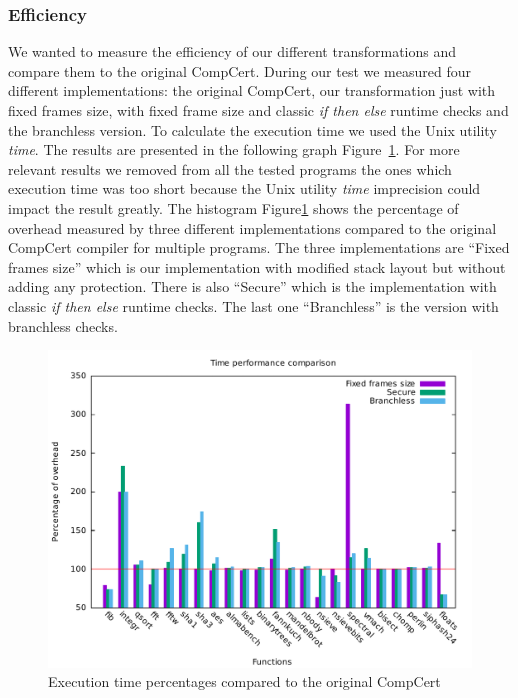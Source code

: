 \documentclass[11pt]{sdm}
\begin{document}
\subsubsection{Efficiency}
\label{ssub:Efficiency}

We wanted to measure the efficiency of our different transformations and compare them to the original CompCert. During our test we measured four different implementations: the original CompCert, our transformation just with fixed frames size, with fixed frame size and classic \textit{if then else} runtime checks and the branchless version.
To calculate the execution time we used the Unix utility \textit{time}.
The results are presented in the following graph Figure~\ref{time_percentage_graph}.
For more relevant results we removed from all the tested programs the ones which execution time was too short because the Unix utility \textit{time} imprecision could impact the result greatly.
The histogram Figure\ref{time_percentage_graph} shows the percentage of overhead measured by three different implementations compared to the original CompCert compiler for multiple programs.
The three implementations are ``Fixed frames size'' which is our implementation with modified stack layout but without adding any protection. There is also ``Secure'' which is the implementation with classic \textit{if then else} runtime checks. The last one ``Branchless'' is the version with branchless checks.

\begin{figure}[!ht]
\centering
\includegraphics[width=1\textwidth]{images/time_percentage_graph.pdf}
\caption{Execution time percentages compared to the original CompCert}
\label{time_percentage_graph}
\end{figure}
\end{document}

